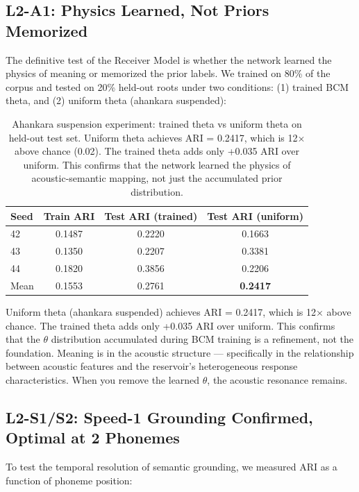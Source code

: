 \documentclass{article}
\begin{document}
\subsection{L2-A1: Physics Learned, Not Priors Memorized}

The definitive test of the Receiver Model is whether the network learned the
physics of meaning or memorized the prior labels. We trained on 80\% of the
corpus and tested on 20\% held-out roots under two conditions: (1) trained BCM
theta, and (2) uniform theta (ahankara suspended):

\begin{table}[h]
\centering
\begin{tabular}{lccc}
\toprule
Seed & Train ARI & Test ARI (trained) & Test ARI (uniform) \\
\midrule
42 & 0.1487 & 0.2220 & 0.1663 \\
43 & 0.1350 & 0.2207 & 0.3381 \\
44 & 0.1820 & 0.3856 & 0.2206 \\
\midrule
Mean & 0.1553 & 0.2761 & \textbf{0.2417} \\
\bottomrule
\end{tabular}
\caption{Ahankara suspension experiment: trained theta vs uniform theta on
held-out test set. Uniform theta achieves ARI = 0.2417, which is 12$\times$
above chance (0.02). The trained theta adds only +0.035 ARI over uniform.
This confirms that the network learned the physics of acoustic-semantic
mapping, not just the accumulated prior distribution.}
\label{tab:ahankara}
\end{table}

Uniform theta (ahankara suspended) achieves ARI = 0.2417, which is 12$\times$
above chance. The trained theta adds only +0.035 ARI over uniform. This confirms
that the $\theta$ distribution accumulated during BCM training is a refinement,
not the foundation. Meaning is in the acoustic structure — specifically in the
relationship between acoustic features and the reservoir's heterogeneous response
characteristics. When you remove the learned $\theta$, the acoustic resonance
remains.

\subsection{L2-S1/S2: Speed-1 Grounding Confirmed, Optimal at 2 Phonemes}

To test the temporal resolution of semantic grounding, we measured ARI as a
function of phoneme position:
\end{document}
